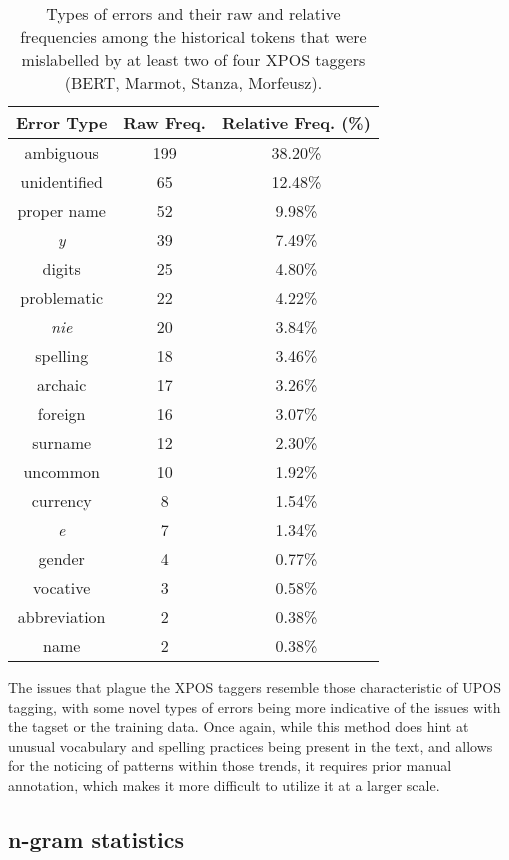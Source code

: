 \renewcommand{\arraystretch}{1.25}
\begin{table}[H]
\begin{center}
\begin{tabular}{|c|cc|}
\hline \bf Error Type & \bf Raw Freq. & \bf Relative Freq. (\%) \\ \hline
ambiguous & 199 & 38.20\% \\
unidentified & 65 & 12.48\% \\
proper name & 52 & 9.98\% \\
\textit{y} & 39 & 7.49\% \\
digits & 25 & 4.80\% \\
problematic & 22 & 4.22\% \\
\textit{nie} & 20 & 3.84\% \\
spelling & 18 & 3.46\% \\
archaic & 17 & 3.26\% \\
foreign & 16 & 3.07\% \\
surname & 12 & 2.30\% \\
uncommon & 10 & 1.92\% \\
currency & 8 & 1.54\% \\
\textit{e} & 7 & 1.34\% \\
gender & 4 & 0.77\% \\
vocative & 3 & 0.58\% \\
abbreviation & 2 & 0.38\% \\
name & 2 & 0.38\% \\
\hline
\end{tabular}
\caption{\label{table:xpos-errors} Types of errors and their raw and relative frequencies among the historical tokens that were mislabelled by at least two of four XPOS taggers (BERT, Marmot, Stanza, Morfeusz).}
\end{center}
\end{table}

The issues that plague the XPOS taggers resemble those characteristic of UPOS tagging, with some novel types of errors being more indicative of the issues with the tagset or the training data. Once again, while this method does hint at unusual vocabulary and spelling practices being present in the text, and allows for the noticing of patterns within those trends, it requires prior manual annotation, which makes it more difficult to utilize it at a larger scale.

\subsection{n-gram statistics}
\label{subsec:ngram-stats-results}

